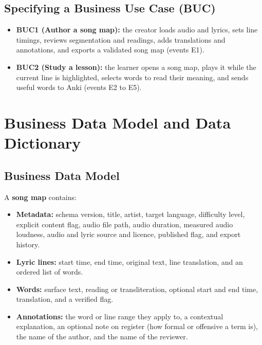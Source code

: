 \documentclass[12pt]{article}
\begin{document}
\subsection{Specifying a Business Use Case (BUC)} \label{SecBUC}
\begin{itemize}
    \item \textbf{BUC1 (Author a song map):} the creator loads audio and
          lyrics, sets line timings, reviews segmentation and readings, adds
          translations and annotations, and exports a validated song map
          (events E1).
    \item \textbf{BUC2 (Study a lesson):} the learner opens a song map, plays
          it while the current line is highlighted, selects words to read
          their meaning, and sends useful words to Anki (events E2 to E5).
\end{itemize}

\section{Business Data Model and Data Dictionary} \label{SecDataModel}
\subsection{Business Data Model}
A \textbf{song map} contains:
\begin{itemize}
    \item \textbf{Metadata:} schema version, title, artist, target language,
          difficulty level, explicit content flag, audio file path, audio
          duration, measured audio loudness, audio and lyric source and
          licence, published flag, and export history.
    \item \textbf{Lyric lines:} start time, end time, original text, line
          translation, and an ordered list of words.
    \item \textbf{Words:} surface text, reading or transliteration,
          optional start and end time, translation, and a verified flag.
    \item \textbf{Annotations:} the word or line range they apply to, a
          contextual explanation, an optional note on register (how formal or
          offensive a term is), the name of the author, and the name of the
          reviewer.
\end{itemize}
\end{document}
